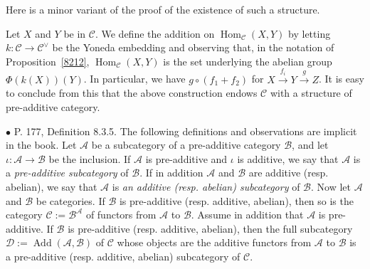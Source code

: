 \documentclass[12pt]{article}
\theoremstyle{remark}%
\newcommand{\bu}{\bullet}
\newcommand{\n}{\noindent}
\newcommand{\cc}{\mathcal}
\newcommand{\C}{\mathcal C}
\newcommand{\xr}{\xrightarrow}
\newcommand{\pr}{Proposition}
\DeclareMathOperator{\Ad}{Add}
\DeclareMathOperator{\h}{Hom}
\begin{document}
Here is a minor variant of the proof of the existence of such a structure. 

Let $X$ and $Y$ be in $\C$. We define the addition on $\h_\C(X,Y)$ by letting $k:\C\to\C^\vee$ be the Yoneda embedding and observing that, in the notation of \pr\ \ref{8212}, $\h_\C(X,Y)$ is the set underlying the abelian group $\Phi(k(X))(Y)$. In particular, we have $g\circ(f_1+f_2)$ for $X\xr{f_i}Y\xr gZ$. It is easy to conclude from this that the above construction endows $\C$ with a structure of pre-additive category. 


\n$\bu$ P. 177, Definition 8.3.5. The following definitions and observations are implicit in the book. Let $\cc A$ be a subcategory of a pre-additive category $\cc B$, and let $\iota:\cc A\to \cc B$ be the inclusion. If $\cc A$ is pre-additive and $\iota$ is additive, we say that $\cc A$ is a {\em pre-additive subcategory} of $\cc B$. If in addition $\cc A$ and $\cc B$ are additive (resp. abelian), we say that $\cc A$ is {\em an additive (resp. abelian) subcategory} of $\cc B$. Now let $\cc A$ and $\cc B$ be categories. If $\cc B$ is pre-additive (resp. additive, abelian), then so is the category $\cc C:=\cc B^\cc A$ of functors from $\cc A$ to $\cc B$. Assume in addition that $\cc A$ is pre-additive. If $\cc B$ is pre-additive (resp. additive, abelian), then the full subcategory $\cc D:=\Ad(\cc A,\cc B)$ of $\cc C$ whose objects are the additive functors from $\cc A$ to $\cc B$ is a pre-additive (resp. additive, abelian) subcategory of $\cc C$. 

\end{document}
